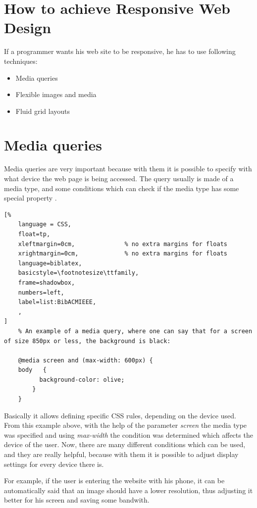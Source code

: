 \section{How to achieve Responsive Web Design}

If a programmer wants his web site to be responsive, he has to use 
following techniques:
\begin{itemize}
\item Media queries 
\item Flexible images and media
\item Fluid grid layouts
\end{itemize}


\section{Media queries}

Media queries are very important because with them it is possible to specify 
with what device the web page is being accessed. The query usually is made of
a media type, and some conditions which can check if the media type has some special
property \parencite{4}.



\begin{lstlisting}[%
    language = CSS, 
    float=tp,
    xleftmargin=0cm,              % no extra margins for floats
    xrightmargin=0cm,             % no extra margins for floats
    language=biblatex,
    basicstyle=\footnotesize\ttfamily,
    frame=shadowbox,
    numbers=left,
    label=list:BibACMIEEE,
    ,
]
    % An example of a media query, where one can say that for a screen of size 850px or less, the background is black:

    @media screen and (max-width: 600px) {
    body   {
          background-color: olive;
        }
    }
\end{lstlisting}



Basically it allows defining specific CSS rules, depending on the device used.
From this example above, with the help of the parameter \emph{screen}
the media type was specified and using \emph{max-width} the condition was determined which
affects the device of the user. Now, there are many different conditions which
can be used, and they are really helpful, because with them it is possible to adjust 
display settings for every device there is. 

For example, if the user is entering the website with his phone, it can be automatically said that an image should have a lower resolution,
thus adjusting it better for his screen and saving some bandwith.

